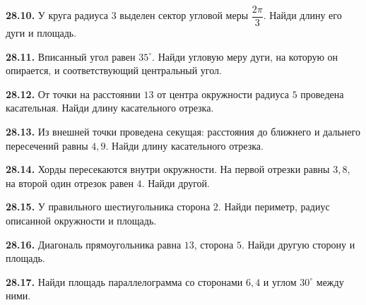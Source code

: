 \noindent\begin{minipage}[t]{\linewidth}\textbf{28.10.} У круга радиуса \(3\) выделен сектор угловой меры \(\dfrac{2\pi}3\). Найди длину его дуги и площадь.\par\end{minipage}\par
\noindent\begin{minipage}[t]{\linewidth}\textbf{28.11.} Вписанный угол равен \(35^\circ\). Найди угловую меру дуги, на которую он опирается, и соответствующий центральный угол.\par\end{minipage}\par
\noindent\begin{minipage}[t]{\linewidth}\textbf{28.12.} От точки на расстоянии \(13\) от центра окружности радиуса \(5\) проведена касательная. Найди длину касательного отрезка.\par\end{minipage}\par
\noindent\begin{minipage}[t]{\linewidth}\textbf{28.13.} Из внешней точки проведена секущая: расстояния до ближнего и дальнего пересечений равны \(4,9\). Найди длину касательного отрезка.\par\end{minipage}\par
\noindent\begin{minipage}[t]{\linewidth}\textbf{28.14.} Хорды пересекаются внутри окружности. На первой отрезки равны \(3,8\), на второй один отрезок равен \(4\). Найди другой.\par\end{minipage}\par
\noindent\begin{minipage}[t]{\linewidth}\textbf{28.15.} У правильного шестиугольника сторона \(2\). Найди периметр, радиус описанной окружности и площадь.\par\end{minipage}\par
\noindent\begin{minipage}[t]{\linewidth}\textbf{28.16.} Диагональ прямоугольника равна \(13\), сторона \(5\). Найди другую сторону и площадь.\par\end{minipage}\par
\noindent\begin{minipage}[t]{\linewidth}\textbf{28.17.} Найди площадь параллелограмма со сторонами \(6,4\) и углом \(30^\circ\) между ними.\par\end{minipage}\par

